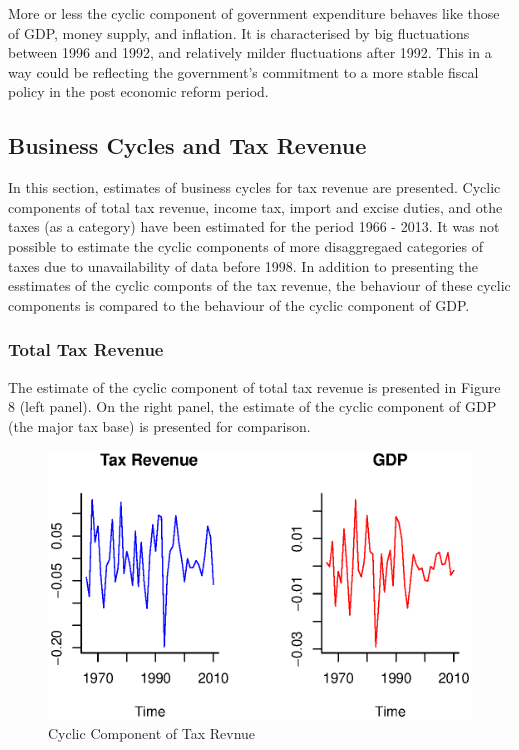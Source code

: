 \documentclass[12pt,a4paper,final]{article}
\begin{document}
More or less the cyclic component of government expenditure behaves like those of GDP, money supply, and inflation.  It is characterised by big fluctuations between 1996 and 1992, and relatively milder fluctuations after 1992. This in a way could be reflecting the government's commitment to a more stable fiscal policy in the post economic reform period.

\newpage
\subsection{Business Cycles and Tax Revenue}

In this section, estimates of business cycles for tax revenue are presented.  Cyclic components of total tax revenue, income tax, import and excise duties, and othe taxes (as a category) have been estimated for the period 1966 - 2013. It was not possible to estimate the cyclic components of more disaggregaed categories of taxes due to unavailability of data before 1998. In addition to presenting the esstimates of the cyclic componts of the tax revenue, the behaviour of these cyclic components is compared to the behaviour of the cyclic component of GDP.

\subsubsection{Total Tax Revenue}

The estimate of the cyclic component of total tax revenue is presented in Figure 8 (left panel). On the right panel, the estimate of the cyclic component of GDP (the major tax base) is presented for comparison.

\begin{figure}[ht]
\centering
\begin{small}
\caption{Cyclic Component of Tax Revnue}
\end{small}
\includegraphics[scale=0.601]{tax_revenue.eps} 
\end{figure}
\end{document}
